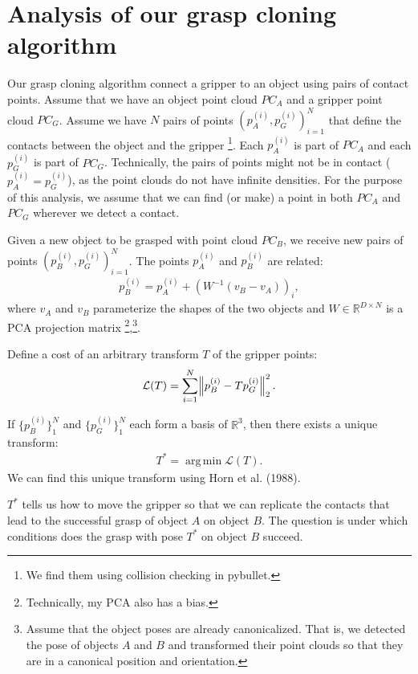 \documentclass{article}
\DeclareMathOperator*{\argmin}{arg\,min}
\begin{document}
\section{Analysis of our grasp cloning algorithm}

Our grasp cloning algorithm connect a gripper to an object using pairs of contact points. Assume that we have an object point cloud $PC_A$ and a gripper point cloud $PC_G$. Assume we have $N$ pairs of points $(p^{(i)}_A, p^{(i)}_G)_{i=1}^N$ that define the contacts between the object and the gripper \footnote{We find them using collision checking in pybullet.}. Each $p^{(i)}_A$ is part of $PC_A$ and each $p^{(i)}_G$ is part of $PC_G$. Technically, the pairs of points might not be in contact ($p^{(i)}_A = p^{(i)}_G$), as the point clouds do not have infinite densities. For the purpose of this analysis, we assume that we can find (or make) a point in both $PC_A$ and $PC_G$ wherever we detect a contact.

Given a new object to be grasped with point cloud $PC_B$, we receive new pairs of points $(p^{(i)}_B, p^{(i)}_G)_{i=1}^N$. The points $p^{(i)}_A$ and $p^{(i)}_B$ are related:
\begin{align}
    p^{(i)}_B = p^{(i)}_A + (W^{-1}(v_B - v_A))_i,
\end{align}
where $v_A$ and $v_B$ parameterize the shapes of the two objects and $W \in \mathbb{R}^{D{\times}N}$ is a PCA projection matrix \footnote{Technically, my PCA also has a bias.},\footnote{Assume that the object poses are already canonicalized. That is, we detected the pose of objects $A$ and $B$ and transformed their point clouds so that they are in a canonical position and orientation.}.

Define a cost of an arbitrary transform $T$ of the gripper points:
\begin{align}
    \mathcal{L}(T) = \sum_{i=1}^N \norm{ p^{(i)}_B - T p^{(i)}_G }_2^2.
\end{align}

If $\{ p^{(i)}_B \}_1^N$ and $\{ p^{(i)}_G \}_1^N$ each form a basis of $\mathbb{R}^3$, then there exists a unique transform:
\begin{align}
    T^* = \argmin \mathcal{L}(T).
\end{align}
We can find this unique transform using Horn et al. (1988).

$T^*$ tells us how to move the gripper so that we can replicate the contacts that lead to the successful grasp of object $A$ on object $B$. The question is under which conditions does the grasp with pose $T^*$ on object $B$ succeed.
\end{document}
